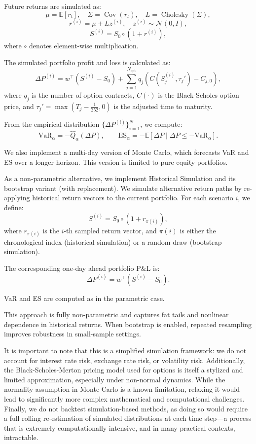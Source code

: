 \documentclass[12pt]{article}
\begin{document}
Future returns are simulated as:
\[
\mu = \mathbb{E}[r_t], \quad \Sigma = \operatorname{Cov}(r_t), \quad L = \operatorname{Cholesky}(\Sigma),
\]
\[
r^{(i)} = \mu + L z^{(i)}, \quad z^{(i)} \sim \mathcal{N}(0, I),
\]
\[
S^{(i)} = S_0 \circ (1 + r^{(i)}),
\]
where \( \circ \) denotes element-wise multiplication.

The simulated portfolio profit and loss is calculated as:
\[
\Delta P^{(i)} = w^\top(S^{(i)} - S_0) + \sum_{j=1}^{N_{\mathrm{opt}}} q_j \left(C(S_j^{(i)}, \tau_j') - C_{j,0}\right),
\]
where \( q_j \) is the number of option contracts, \( C(\cdot) \) is the Black-Scholes option price, and \( \tau_j' = \max(T_j - \tfrac{1}{252}, 0) \) is the adjusted time to maturity.

From the empirical distribution \( \{\Delta P^{(i)}\}_{i=1}^N \), we compute:
\[
\text{VaR}_\alpha = -\widehat{Q}_\alpha(\Delta P), \qquad
\text{ES}_\alpha = -\mathbb{E}[\Delta P \mid \Delta P \le -\text{VaR}_\alpha].
\]

We also implement a multi-day version of Monte Carlo, which forecasts VaR and ES over a longer horizon. This version is limited to pure equity portfolios.

As a non-parametric alternative, we implement Historical Simulation and its bootstrap variant (with replacement). We simulate alternative return paths by re-applying historical return vectors to the current portfolio. For each scenario \( i \), we define:
\[
S^{(i)} = S_0 \circ (1 + r_{\pi(i)}),
\]
where \( r_{\pi(i)} \) is the \( i \)-th sampled return vector, and \( \pi(i) \) is either the chronological index (historical simulation) or a random draw (bootstrap simulation).

The corresponding one-day ahead portfolio P\&L is:
\[
\Delta P^{(i)} = w^\top (S^{(i)} - S_0).
\]

VaR and ES are computed as in the parametric case.

This approach is fully non-parametric and captures fat tails and nonlinear dependence in historical returns. When bootstrap is enabled, repeated resampling improves robustness in small-sample settings.

It is important to note that this is a simplified simulation framework: we do not account for interest rate risk, exchange rate risk, or volatility risk. Additionally, the Black-Scholes-Merton pricing model used for options is itself a stylized and limited approximation, especially under non-normal dynamics. While the normality assumption in Monte Carlo is a known limitation, relaxing it would lead to significantly more complex mathematical and computational challenges. Finally, we do not backtest simulation-based methods, as doing so would require a full rolling re-estimation of simulated distributions at each time step—a process that is extremely computationally intensive, and in many practical contexts, intractable.
\end{document}
